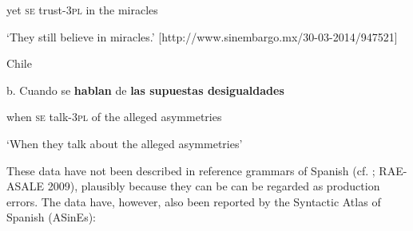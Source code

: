 \documentclass[output=paper]{langsci/langscibook}
\begin{document}
\begin{styleBodyTextIndentii}
        yet         \textsc{se}   trust{}-\textsc{3pl}  in  the   miracles
\end{styleBodyTextIndentii}

\begin{styleBodyTextIndentii}
‘They still believe in miracles.’ [http://www.sinembargo.mx/30-03-2014/947521]
\end{styleBodyTextIndentii}

\begin{styleBodyTextIndentii}
  Chile
\end{styleBodyTextIndentii}

\begin{styleBodyTextIndentii}
b.   Cuando se   \textbf{hablan}    de  \textbf{las supuestas desigualdades}  
\end{styleBodyTextIndentii}

\begin{styleBodyTextIndentii}
                 when     \textsc{se}   talk{}-\textsc{3pl}   of  the alleged      asymmetries
\end{styleBodyTextIndentii}

\begin{styleBodyTextIndentii}
       ‘When they talk about the alleged asymmetries’
\end{styleBodyTextIndentii}

\begin{styleBodyTextIndentii}
\end{styleBodyTextIndentii}

\begin{styleHTMLPreformatted}
These data have not been described in reference grammars of Spanish (cf. \citet{Bosque1999}; RAE-ASALE 2009), plausibly because they can be can be regarded as production errors. The data have, however, also been reported by the Syntactic Atlas of Spanish (ASinEs):
\end{styleHTMLPreformatted}
\end{document}
